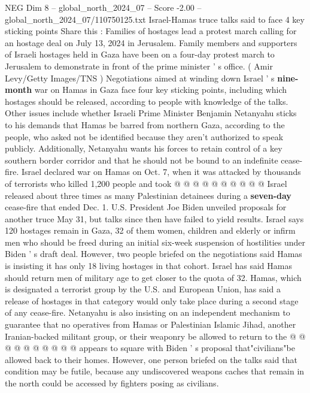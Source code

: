 \begin{textsample}{NEG Dim 8 – global\_north\_2024\_07 – Score -2.00 – global\_north\_2024\_07/110750125.txt}  \label{ex:f8_neg_180}
Israel-Hamas truce talks said to face 4 key sticking points Share this : Families of hostages lead a protest march calling for an hostage deal on July 13, 2024 in Jerusalem.
Family members and supporters of Israeli hostages held in Gaza have been on a four-day protest march to Jerusalem to demonstrate in front of the prime minister ' s office. ( Amir Levy/Getty Images/TNS ) Negotiations aimed at winding down Israel ' s \textbf{nine-month} war on Hamas in Gaza face four key sticking points, including which hostages should be released, according to people with knowledge of the talks.
Other issues include whether Israeli Prime Minister Benjamin Netanyahu sticks to his demands that Hamas be barred from northern Gaza, according to the people, who asked not be identified because they aren't authorized to speak publicly.
Additionally, Netanyahu wants his forces to retain control of a key southern border corridor and that he should not be bound to an indefinite cease-fire.
Israel declared war on Hamas on Oct. 7, when it was attacked by thousands of terrorists who killed 1,200 people and took @ @ @ @ @ @ @ @ @ @ Israel released about three times as many Palestinian detainees during a \textbf{seven-day} cease-fire that ended Dec. 1.
U.S.
President Joe Biden unveiled proposals for another truce May 31, but talks since then have failed to yield results.
Israel says 120 hostages remain in Gaza, 32 of them women, children and elderly or infirm men who should be freed during an initial six-week suspension of hostilities under Biden ' s draft deal.
However, two people briefed on the negotiations said Hamas is insisting it has only 18 living hostages in that cohort.
Israel has said Hamas should return men of military age to get closer to the quota of 32.
Hamas, which is designated a terrorist group by the U.S. and European Union, has said a release of hostages in that category would only take place during a second stage of any cease-fire.
Netanyahu is also insisting on an independent mechanism to guarantee that no operatives from Hamas or Palestinian Islamic Jihad, another Iranian-backed militant group, or their weaponry be allowed to return to the @ @ @ @ @ @ @ @ @ @ appears to square with Biden ' s proposal that"civilians"be allowed back to their homes.
However, one person briefed on the talks said that condition may be futile, because any undiscovered weapons caches that remain in the north could be accessed by fighters posing as civilians.

\end{textsample}
